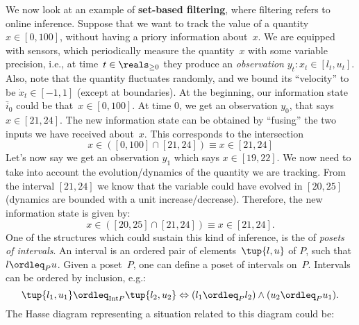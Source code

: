 \begin{example}
  We now look at an example of \textbf{set-based filtering}, where filtering refers to online inference.
  Suppose that we want to track the value of a quantity~$x\in [0,100]$, without having a priory information about~$x$.
  We are equipped with sensors, which periodically measure the quantity~$x$ with some variable precision, i.e., at time~$t\in \reals_{\geq 0}$ they produce an \emph{observation} $y_t\colon x_t\in [l_t,u_t]$.
  Also, note that the quantity fluctuates randomly, and we bound its ``velocity'' to be $\dot{x}_t\in [-1,1]$ (except at boundaries).
  At the beginning, our information state $\bar{i}_0$ could be that~$x\in [0,100]$.
  At time 0, we get an observation $y_0$, that says $x\in [21,24]$.
  The new information state can be obtained by ``fusing'' the two inputs we have received about~$x$. This corresponds to the intersection
  \begin{equation*}
    x\in \left( [0,100] \cap [21,24]\right)\equiv x\in [21,24]
  \end{equation*}
  Let's now say we get an observation $y_1$ which says $x\in [19,22]$.
  We now need to take into account the evolution/dynamics of the quantity we are tracking. From the interval $[21,24]$ we know that the variable could have evolved in $[20,25]$ (dynamics are bounded with a unit increase/decrease). Therefore, the new information state is given by:
  \begin{equation*}
    x\in \left( [20,25] \cap [21,24]\right)\equiv x\in [21,24].
  \end{equation*}
  One of the structures which could sustain this kind of inference, is the of \emph{posets of intervals}.
  An interval is an ordered pair of elements~$\tup{l,u}$ of $P$, such that $l\ordleq_P u$.
  Given a poset~$P$, one can define a poset of intervals on~$P$. Intervals can be ordered by inclusion, e.g.:
  \begin{equation*}
    \tup{l_1,u_1}\ordleq_{\mathrm{Int} P}\tup{l_2,u_2} \Leftrightarrow (l_1\ordleq_P l_2)\wedge (u_2\ordleq_P u_1).
  \end{equation*}
  The Hasse diagram representing a situation related to this diagram could be:
  \begin{center}
  \end{center}
\end{example}

